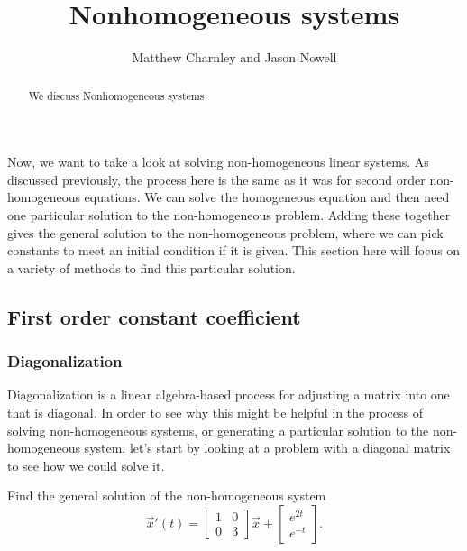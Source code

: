 \documentclass{ximera}
\title{Nonhomogeneous systems}
\author{Matthew Charnley and Jason Nowell}
\begin{document}
\begin{abstract}
    We discuss Nonhomogeneous systems
\end{abstract}
\maketitle

\label{nonhomogsys:section}


Now, we want to take a look at solving non-homogeneous linear systems. As discussed previously, the process here is the same as it was for second order non-homogeneous equations. We can solve the homogeneous equation and then need one particular solution to the non-homogeneous problem. Adding these together gives the general solution to the non-homogeneous problem, where we can pick constants to meet an initial condition if it is given. This section here will focus on a variety of methods to find this particular solution.

\subsection{First order constant coefficient}

\subsubsection{Diagonalization}


Diagonalization is a linear algebra-based process for adjusting a matrix into one that is diagonal. In order to see why this might be helpful in the process of solving non-homogeneous systems, or generating a particular solution to the non-homogeneous system, let's start by looking at a problem with a diagonal matrix to see how we could solve it. 

\begin{example}
    Find the general solution of the non-homogeneous system
    \[
        \vec{x}'(t) = \begin{bmatrix}1& 0 \\ 0 & 3 \end{bmatrix}\vec{x} + \begin{bmatrix} e^{2t} \\ e^{-t} \end{bmatrix}.
    \]
\end{example}
\end{document}
